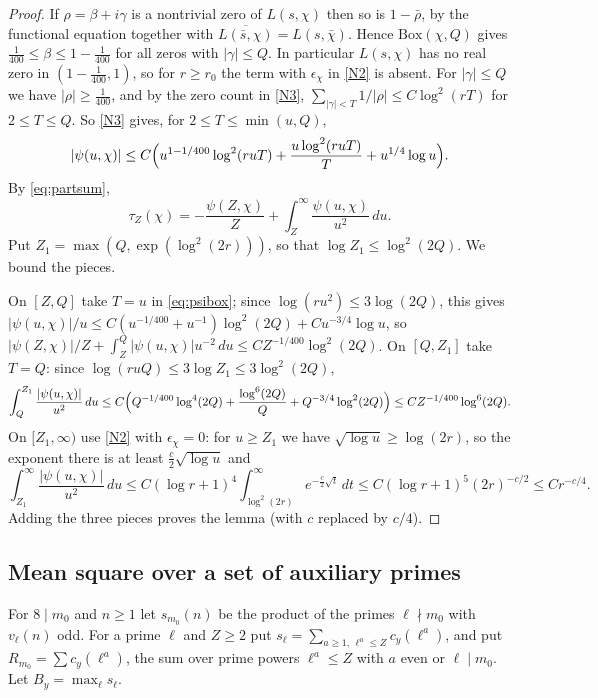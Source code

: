 \documentclass[11pt]{amsart}
\theoremstyle{plain}
\theoremstyle{definition}
\numberwithin{equation}{section}
\begin{document}
\begin{proof}
If $\rho=\beta+i\gamma$ is a nontrivial zero of $L(s,\chi)$ then so is $1-\bar\rho$, by the
functional equation together with $\overline{L(\bar s,\chi)}=L(s,\bar\chi)$. Hence $\mathrm{Box}(\chi,Q)$
gives $\frac1{400}\le\beta\le1-\frac1{400}$ for all zeros with $|\gamma|\le Q$. In particular
$L(s,\chi)$ has no real zero in $(1-\frac1{400},1)$, so for $r\ge r_0$ the term with $\epsilon_\chi$ in
\ref{N2} is absent. For $|\gamma|\le Q$ we have
$|\rho|\ge\frac1{400}$, and by the zero count in \ref{N3},
$\sum_{|\gamma|<T}1/|\rho|\le C\log^2(rT)$ for $2\le T\le Q$. So \ref{N3} gives, for
$2\le T\le\min(u,Q)$,
\begin{equation}\label{eq:psibox}
|\psi(u,\chi)|\le C\Bigl(u^{1-1/400}\log^2(ruT)+\frac{u\log^2(ruT)}{T}+u^{1/4}\log u\Bigr).
\end{equation}
By \eqref{eq:partsum},
\[
\tau_Z(\chi)=-\frac{\psi(Z,\chi)}Z+\int_Z^\infty\frac{\psi(u,\chi)}{u^2}\,du.
\]
Put $Z_1=\max(Q,\exp(\log^2(2r)))$, so that $\log Z_1\le\log^2(2Q)$. We bound the pieces.

On $[Z,Q]$ take $T=u$ in \eqref{eq:psibox}; since $\log(ru^2)\le3\log(2Q)$, this gives $|\psi(u,\chi)|/u\le C(u^{-1/400}+u^{-1})\log^2(2Q)+Cu^{-3/4}\log u$,
so $|\psi(Z,\chi)|/Z+\int_Z^Q|\psi(u,\chi)|u^{-2}\,du\le CZ^{-1/400}\log^2(2Q)$.
On $[Q,Z_1]$ take $T=Q$: since $\log(ruQ)\le3\log Z_1\le3\log^2(2Q)$,
\[
\int_Q^{Z_1}\frac{|\psi(u,\chi)|}{u^2}\,du\le C\Bigl(Q^{-1/400}\log^4(2Q)+\frac{\log^6(2Q)}{Q}+Q^{-3/4}\log^2(2Q)\Bigr)
\le CZ^{-1/400}\log^6(2Q).
\]
On $[Z_1,\infty)$ use \ref{N2} with $\epsilon_\chi=0$: for $u\ge Z_1$ we have
$\sqrt{\log u}\ge\log(2r)$, so the exponent there is at least $\frac c2\sqrt{\log u}$ and
\[
\int_{Z_1}^\infty\frac{|\psi(u,\chi)|}{u^2}\,du\le C(\log r+1)^4\int_{\log^2(2r)}^\infty e^{-\frac c2\sqrt t}\,dt
\le C(\log r+1)^5(2r)^{-c/2}\le Cr^{-c/4}.
\]
Adding the three pieces proves the lemma (with $c$ replaced by $c/4$).
\end{proof}

\subsection{Mean square over a set of auxiliary primes}

For $8\mid m_0$ and $n\ge1$ let $s_{m_0}(n)$ be the product of the primes $\ell\nmid m_0$ with
$v_\ell(n)$ odd. For a prime $\ell$ and $Z\ge2$ put $s_\ell=\sum_{a\ge1,\,\ell^a\le Z}c_y(\ell^a)$, and
put $R_{m_0}=\sum c_y(\ell^a)$, the sum over prime powers $\ell^a\le Z$ with $a$ even or
$\ell\mid m_0$. Let $B_y=\max_\ell s_\ell$.
\end{document}
